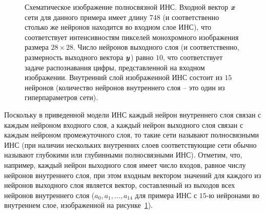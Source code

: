 \documentclass[a4paper,12pt,russian]{article} %
\begin{document}
\begin{figure}[t!]
	\caption{
		Схематическое изображение полносвязной ИНС.
		Входной вектор $\bm{x}$ сети для данного примера имеет длину $748$ (и соответственно столько же нейронов находится во входном слое ИНС), что соответствует интенсивностям пикселей монохромного изображения размера $28 \times 28$.
		Число нейронов выходного слоя (и соответственно, размерность выходного вектора $\bm{y}$) равно $10$, что соответствует задаче распознавания цифры, представленной на входном изображении.
		Внутренний слой изображенной ИНС состоит из $15$ нейронов (количество нейронов внутреннего слоя -- это один из гиперпараметров сети).
        }
        \label{fig:nn}
\end{figure}

Поскольку в приведенной модели ИНС каждый нейрон внутреннего слоя связан с каждым нейроном входного слоя, а каждый нейрон выходного слоя связан с каждым нейроном промежуточного слоя, то такие сети называют полносвязными ИНС (при наличии нескольких внутренних слоев соответствующие сети обычно называют глубокими или глубинными полносвязными ИНС).
Отметим, что, например, каждый нейрон выходного слоя имеет число входов, равное числу нейронов внутреннего слоя, при этом входным вектором значений для каждого из нейронов выходного слоя является вектор, составленный из выходов всех нейронов внутреннего слоя ($a_0, a_1, \ldots, a_{14}$ для примера ИНС с $15$-ю нейронами во внутреннем слое, изображенной на рисунке~\ref{fig:nn}).
\end{document}
